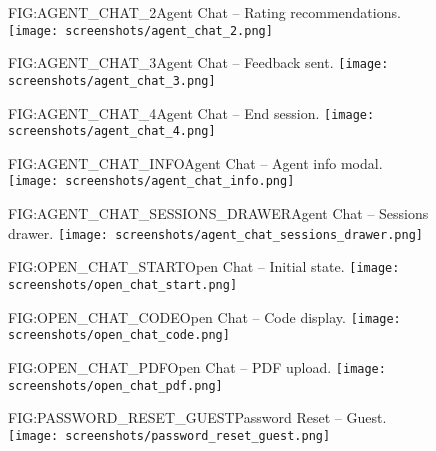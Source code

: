 \begin{figure}[Agent Chat -- Rating recommendations]{FIG:AGENT_CHAT_2}{Agent Chat -- Rating recommendations.}
    \texttt{[image: screenshots/agent\_chat\_2.png]}
\end{figure}

\begin{figure}[Agent Chat -- Feedback sent]{FIG:AGENT_CHAT_3}{Agent Chat -- Feedback sent.}
    \texttt{[image: screenshots/agent\_chat\_3.png]}
\end{figure}

\begin{figure}[Agent Chat -- End session]{FIG:AGENT_CHAT_4}{Agent Chat -- End session.}
    \texttt{[image: screenshots/agent\_chat\_4.png]}
\end{figure}

\begin{figure}[Agent Chat -- Agent info modal]{FIG:AGENT_CHAT_INFO}{Agent Chat -- Agent info modal.}
    \texttt{[image: screenshots/agent\_chat\_info.png]}
\end{figure}

\begin{figure}[Agent Chat -- Sessions drawer]{FIG:AGENT_CHAT_SESSIONS_DRAWER}{Agent Chat -- Sessions drawer.}
    \texttt{[image: screenshots/agent\_chat\_sessions\_drawer.png]}
\end{figure}

\begin{figure}[Open Chat -- Initial state]{FIG:OPEN_CHAT_START}{Open Chat -- Initial state.}
    \texttt{[image: screenshots/open\_chat\_start.png]}
\end{figure}

\begin{figure}[Open Chat -- Code display]{FIG:OPEN_CHAT_CODE}{Open Chat -- Code display.}
    \texttt{[image: screenshots/open\_chat\_code.png]}
\end{figure}

\begin{figure}[Open Chat -- PDF upload]{FIG:OPEN_CHAT_PDF}{Open Chat -- PDF upload.}
    \texttt{[image: screenshots/open\_chat\_pdf.png]}
\end{figure}

\begin{figure}[Password Reset -- Guest]{FIG:PASSWORD_RESET_GUEST}{Password Reset -- Guest.}
    \texttt{[image: screenshots/password\_reset\_guest.png]}
\end{figure}

